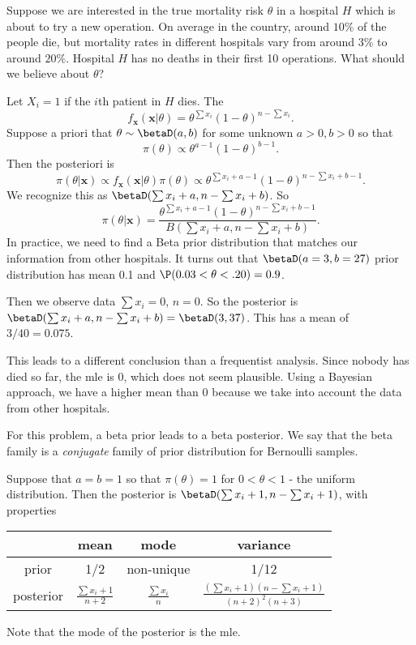 \documentclass[a4paper]{article}
\begin{document}
\begin{eg}
  Suppose we are interested in the true mortality risk $\theta$ in a hospital $H$ which is about to try a new operation. On average in the country, around $10\%$ of the people die, but mortality rates in different hospitals vary from around $3\%$ to around $20\%$. Hospital $H$ has no deaths in their first 10 operations. What should we believe about $\theta$?

  Let $X_i = 1$ if the $i$th patient in $H$ dies. The
  \[
    f_{\mathbf{x}}(\mathbf{x}|\theta) = \theta^{\sum x_i}(1 - \theta)^{n - \sum x_i}.
  \]
  Suppose a priori that $\theta\sim \betaD(a, b)$ for some unknown $a > 0, b > 0$ so that
  \[
    \pi(\theta)\propto \theta^{a - 1}(1 - \theta)^{b - 1}.
  \]
  Then the posteriori is
  \[
    \pi(\theta|\mathbf{x})\propto f_{\mathbf{x}}(\mathbf{x}|\theta)\pi(\theta)\propto \theta^{\sum x_i + a - 1}(1 - \theta)^{n- \sum x_i + b - 1}.
  \]
  We recognize this as $\betaD(\sum x_i + a, n - \sum x_i + b)$. So
  \[
    \pi(\theta|\mathbf{x}) = \frac{\theta^{\sum x_i + a - 1}(1 - \theta)^{n - \sum x_i + b - 1}}{B(\sum x_i + a, n - \sum x_i + b)}.
  \]
  In practice, we need to find a Beta prior distribution that matches our information from other hospitals. It turns out that $\betaD(a = 3, b = 27)$ prior distribution has mean 0.1 and $\P(0.03 < \theta < .20) = 0.9$.

  Then we observe data $\sum x_i = 0$, $n = 0$. So the posterior is $\betaD(\sum x_i + a, n - \sum x_i + b) = \betaD(3, 37)$. This has a mean of $3/40 = 0.075$.

  This leads to a different conclusion than a frequentist analysis. Since nobody has died so far, the mle is $0$, which does not seem plausible. Using a Bayesian approach, we have a higher mean than $0$ because we take into account the data from other hospitals.
\end{eg}

For this problem, a beta prior leads to a beta posterior. We say that the beta family is a \emph{conjugate} family of prior distribution for Bernoulli samples.

Suppose that $a = b = 1$ so that $\pi (\theta) = 1$ for $0 < \theta < 1$ - the uniform distribution. Then the posterior is $\betaD(\sum x_i + 1, n - \sum x_i + 1)$, with properties
\begin{center}
  \begin{tabular}[]{cccc}
    \toprule
    &mean & mode & variance\\
    \midrule
    prior & 1/2 & non-unique & 1/12\\
    posterior & $\displaystyle \frac{\sum x_i + 1}{n + 2}$ & $\displaystyle \frac{\sum x_i}{n}$ & $\displaystyle\frac{(\sum x_i + 1)(n - \sum x_i + 1)}{(n + 2)^2(n + 3)}$\\
    \bottomrule
  \end{tabular}
\end{center}
Note that the mode of the posterior is the mle.
\end{document}
